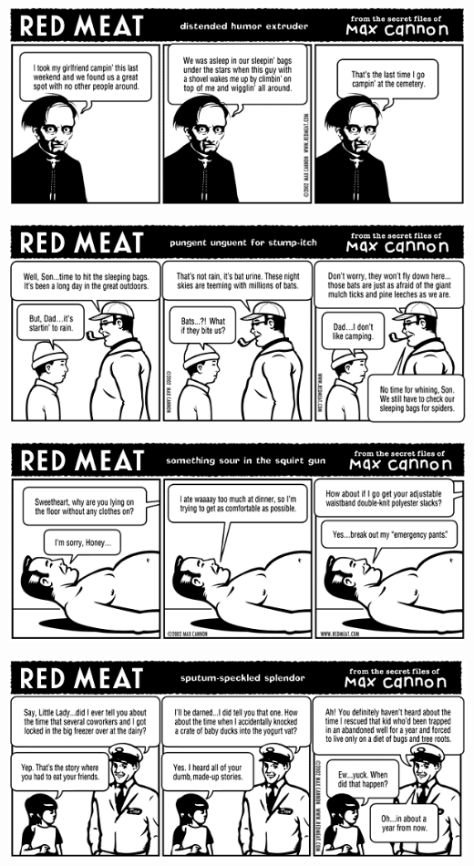 \documentclass[a4paper,twoside,11pt]{article}
\begin{document}
\includegraphics[width=\textwidth]{redmeat_2002-07-09.png}



\includegraphics[width=\textwidth]{redmeat_2002-07-16.png}



\includegraphics[width=\textwidth]{redmeat_2002-07-23.png}



\includegraphics[width=\textwidth]{redmeat_2002-07-30.png}
\end{document}
